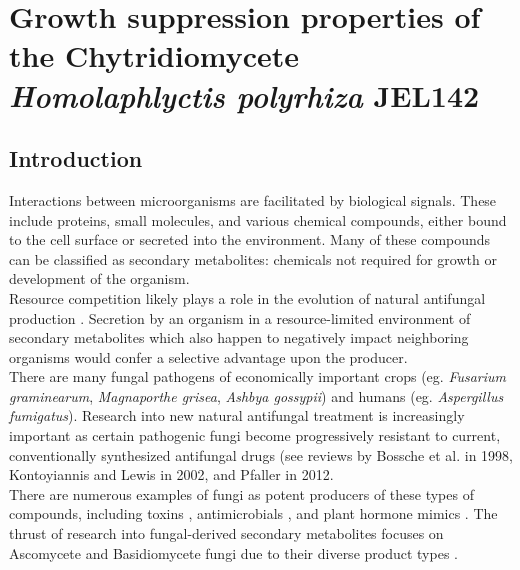 ﻿%
\chapter{Growth suppression properties of the Chytridiomycete \textit{Homolaphlyctis polyrhiza} JEL142}
\label{chap:HpInhibition}
\section{Introduction}
Interactions between microorganisms are facilitated by biological signals. These include proteins, small molecules, and various chemical compounds, either bound to the cell surface or secreted into the environment. Many of these compounds can be classified as secondary metabolites: chemicals not required for growth or development of the organism. \\
\indent Resource competition likely plays a role in the evolution of natural antifungal production \cite{Vicente2003}. Secretion by an organism in a resource-limited environment of secondary metabolites which also happen to negatively impact neighboring organisms would confer a selective advantage upon the producer.\\
\indent There are many fungal pathogens of economically important crops (eg. \textit{Fusarium graminearum}, \textit{Magnaporthe grisea}, \textit{Ashbya gossypii}) and humans (eg. \textit{Aspergillus fumigatus}). Research into new natural antifungal treatment is increasingly important as certain pathogenic fungi become progressively resistant to current, conventionally synthesized antifungal drugs (see reviews by Bossche et al. in 1998\nocite{Bossche1998}, Kontoyiannis and Lewis in 2002\nocite{Kontoyiannis2002}, and Pfaller in 2012\nocite{Pfaller2012}. \\
\indent There are numerous examples of fungi as potent producers of these types of compounds, including toxins \cite{Kokkonen2010}, antimicrobials \cite{Wiemann2014}, and plant hormone mimics \cite{Howlett2006}. The thrust of research into fungal-derived secondary metabolites focuses on Ascomycete and Basidiomycete fungi due to their diverse product types \cite{Berdy2012}.\\
